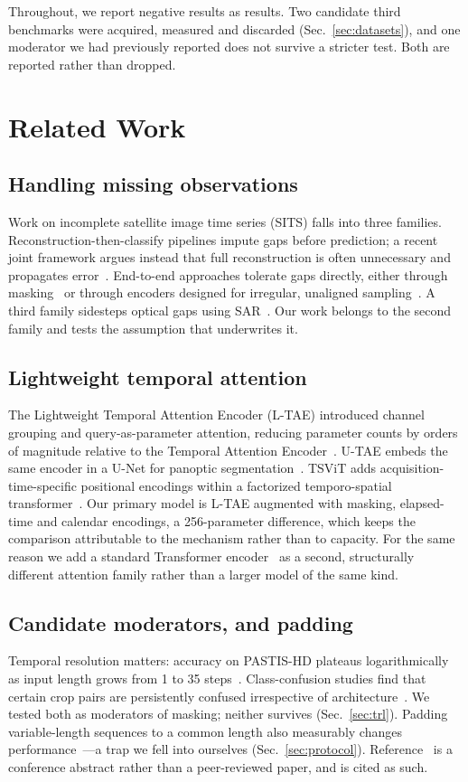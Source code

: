 \documentclass[journal]{IEEEtran}
\begin{document}
Throughout, we report negative results as results. Two candidate third
benchmarks were acquired, measured and discarded (Sec.~\ref{sec:datasets}), and
one moderator we had previously reported does not survive a stricter
test. Both are reported rather than dropped.

\section{Related Work}

\subsection{Handling missing observations}
Work on incomplete satellite image time series (SITS) falls into three
families. Reconstruction-then-classify pipelines impute gaps before prediction;
a recent joint framework argues instead that full reconstruction is often
unnecessary and propagates error~\cite{jointfrp}. End-to-end approaches
tolerate gaps directly, either through masking~\cite{mae} or through encoders
designed for irregular, unaligned sampling~\cite{alise}. A third family
sidesteps optical gaps using SAR~\cite{sitsreview}. Our work belongs to the
second family and tests the assumption that underwrites it.

\subsection{Lightweight temporal attention}
The Lightweight Temporal Attention Encoder (L-TAE) introduced channel grouping
and query-as-parameter attention, reducing parameter counts by orders of
magnitude relative to the Temporal Attention Encoder~\cite{ltae}. U-TAE embeds
the same encoder in a U-Net for panoptic
segmentation~\cite{utae}. TSViT adds acquisition-time-specific positional
encodings within a factorized temporo-spatial transformer~\cite{tsvit}. Our
primary model is L-TAE augmented with masking, elapsed-time and calendar
encodings, a 256-parameter difference, which keeps the comparison attributable
to the mechanism rather than to capacity. For the same reason we add a standard
Transformer encoder~\cite{vaswani} as a second, structurally different attention
family rather than a larger model of the same kind.

\subsection{Candidate moderators, and padding}
Temporal resolution matters: accuracy on PASTIS-HD plateaus logarithmically as
input length grows from 1 to 35 steps~\cite{shaping}. Class-confusion studies
find that certain crop pairs are persistently confused irrespective of
architecture~\cite{eurosat}. We tested both as moderators of masking; neither
survives (Sec.~\ref{sec:trl}). Padding variable-length sequences to a common
length also measurably changes performance~\cite{padding}---a trap we fell into
ourselves (Sec.~\ref{sec:protocol}). Reference~\cite{mae} is a conference
abstract rather than a peer-reviewed paper, and is cited as such.
\end{document}
